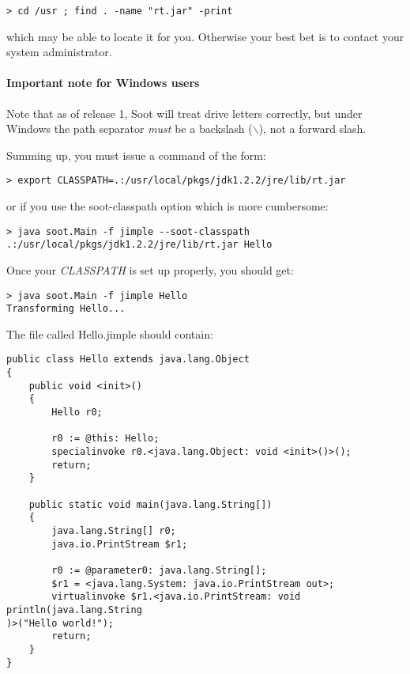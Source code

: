 \documentclass{article}
\begin{document}
\begin{verbatim}
> cd /usr ; find . -name "rt.jar" -print
\end{verbatim}

which may be able to locate it for you.  Otherwise your best bet is to contact
your system administrator.

\paragraph{Important note for Windows users} Note that as of release 1,
Soot will treat drive letters correctly, but under Windows the path
separator {\em must} be a backslash ($\backslash$), not a forward slash.

Summing up, you must issue a command of the form:

\begin{verbatim}
> export CLASSPATH=.:/usr/local/pkgs/jdk1.2.2/jre/lib/rt.jar
\end{verbatim}

or if you use the soot-classpath option which is more cumbersome:

\begin{verbatim}
> java soot.Main -f jimple --soot-classpath .:/usr/local/pkgs/jdk1.2.2/jre/lib/rt.jar Hello
\end{verbatim}


Once your {\em CLASSPATH} is set up properly, you should get:

\begin{verbatim}
> java soot.Main -f jimple Hello
Transforming Hello...
\end{verbatim}

The file called Hello.jimple should contain:

\begin{verbatim}
public class Hello extends java.lang.Object
{
    public void <init>()
    {
        Hello r0;

        r0 := @this: Hello;
        specialinvoke r0.<java.lang.Object: void <init>()>();
        return;
    }

    public static void main(java.lang.String[])
    {
        java.lang.String[] r0;
        java.io.PrintStream $r1;

        r0 := @parameter0: java.lang.String[];
        $r1 = <java.lang.System: java.io.PrintStream out>;
        virtualinvoke $r1.<java.io.PrintStream: void println(java.lang.String
)>("Hello world!");
        return;
    }
}
\end{verbatim}
\end{document}
